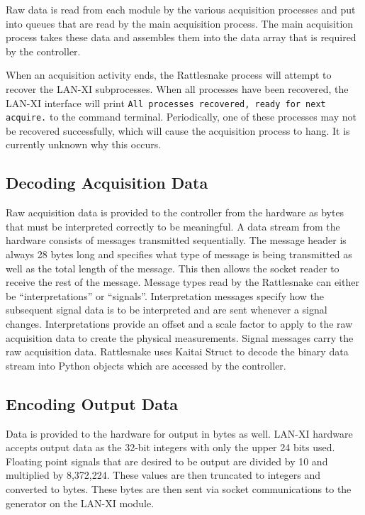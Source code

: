 \documentclass[pdf,12pt,report]{SANDreport}
\newcommand{\inlineCode}{\lstinline[basicstyle=\bfseries\ttfamily]}
\begin{document}
    Raw data is read from each module by the various acquisition processes and put into queues that are read by the main acquisition process.  The main acquisition process takes these data and assembles them into the data array that is required by the controller.
    
    When an acquisition activity ends, the Rattlesnake process will attempt to recover the LAN-XI subprocesses.  When all processes have been recovered, the LAN-XI interface will print \inlineCode{All processes recovered, ready for next acquire.} to the command terminal.  Periodically, one of these processes may not be recovered successfully, which will cause the acquisition process to hang.  It is currently unknown why this occurs.
    
    \subsection{Decoding Acquisition Data}
    Raw acquisition data is provided to the controller from the hardware as bytes that must be interpreted correctly to be meaningful.  A data stream from the hardware consists of messages transmitted sequentially.  The message header is always 28 bytes long and specifies what type of message is being transmitted as well as the total length of the message.  This then allows the socket reader to receive the rest of the message.  Message types read by the Rattlesnake can either be ``interpretations'' or ``signals''. Interpretation messages specify how the subsequent signal data is to be interpreted and are sent whenever a signal changes.  Interpretations provide an offset and a scale factor to apply to the raw acquisition data to create the physical measurements.  Signal messages carry the raw acquisition data.  Rattlesnake uses Kaitai Struct to decode the binary data stream into Python objects which are accessed by the controller.
    
    \subsection{Encoding Output Data}
    Data is provided to the hardware for output in bytes as well.  LAN-XI hardware accepts output data as the 32-bit integers with only the upper 24 bits used.  Floating point signals that are desired to be output are divided by 10 and multiplied by 8,372,224.  These values are then truncated to integers and converted to bytes.  These bytes are then sent via socket communications to the generator on the LAN-XI module.
    
\end{document}
